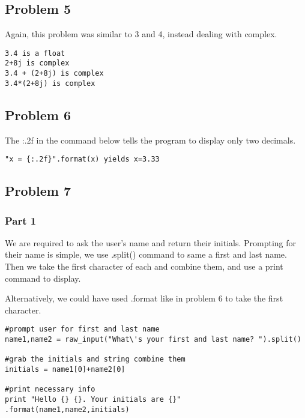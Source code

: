 \documentclass[11pt]{article}
\begin{document}
\subsection{Problem 5}
Again, this problem was similar to 3 and 4, instead dealing with complex. 
\begin{verbatim}
3.4 is a float
2+8j is complex
3.4 + (2+8j) is complex
3.4*(2+8j) is complex
\end{verbatim}

\subsection{Problem 6}
The {:.2f} in the command below tells the program to display only two decimals.
\begin{verbatim}
"x = {:.2f}".format(x) yields x=3.33
\end{verbatim}

\subsection{Problem 7}
\subsubsection{Part 1}
We are required to ask the user's name and return their initials. Prompting for their name is simple, we use .split() command to same a first and last name. Then we take the first character of each and combine them, and use a print command to display.

Alternatively, we could have used .format like in problem 6 to take the first character. 

\begin{verbatim}
#prompt user for first and last name
name1,name2 = raw_input("What\'s your first and last name? ").split()

#grab the initials and string combine them
initials = name1[0]+name2[0]

#print necessary info
print "Hello {} {}. Your initials are {}" .format(name1,name2,initials)
\end{verbatim}
\end{document}
